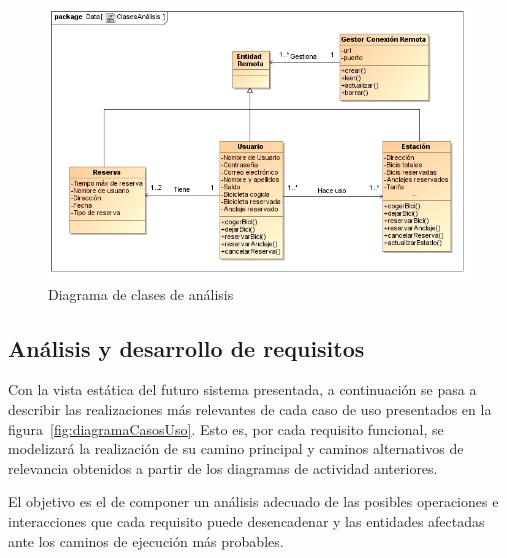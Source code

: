 \begin{figure}
	\centering
	\includegraphics[width=\linewidth,height=\textheight,keepaspectratio]{Images/Diagramas/03_ClasesAnalisis}
	\caption{Diagrama de clases de análisis}
	\label{fig:diagramaClasesAnalisis}
\end{figure}

\subsection{Análisis y desarrollo de requisitos}

Con la vista estática del futuro sistema presentada, a continuación se pasa a describir las realizaciones más relevantes de cada caso de uso presentados en la figura~\ref{fig:diagramaCasosUso}. Esto es, por cada requisito funcional, se modelizará la realización de su camino principal y caminos alternativos de relevancia obtenidos a partir de los diagramas de actividad anteriores.

El objetivo es el de componer un análisis adecuado de las posibles operaciones e interacciones que cada requisito puede desencadenar y las entidades afectadas ante los caminos de ejecución más probables.

